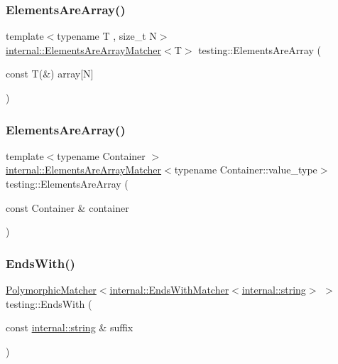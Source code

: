 \subsubsection{\texorpdfstring{Elements\+Are\+Array()}{ElementsAreArray()}\hspace{0.1cm}{\footnotesize\ttfamily [3/4]}}
{\footnotesize\ttfamily template$<$typename T , size\+\_\+t N$>$ \\
\hyperlink{classtesting_1_1internal_1_1_elements_are_array_matcher}{internal\+::\+Elements\+Are\+Array\+Matcher}$<$T$>$ testing\+::\+Elements\+Are\+Array (\begin{DoxyParamCaption}\item[{const T(\&)}]{array\mbox{[}\+N\mbox{]} }\end{DoxyParamCaption})\hspace{0.3cm}{\ttfamily [inline]}}

\mbox{\label{namespacetesting_ad257747adbe056feaa92f449063d681f}} 
\subsubsection{\texorpdfstring{Elements\+Are\+Array()}{ElementsAreArray()}\hspace{0.1cm}{\footnotesize\ttfamily [4/4]}}
{\footnotesize\ttfamily template$<$typename Container $>$ \\
\hyperlink{classtesting_1_1internal_1_1_elements_are_array_matcher}{internal\+::\+Elements\+Are\+Array\+Matcher}$<$typename Container\+::value\+\_\+type$>$ testing\+::\+Elements\+Are\+Array (\begin{DoxyParamCaption}\item[{const Container \&}]{container }\end{DoxyParamCaption})\hspace{0.3cm}{\ttfamily [inline]}}

\mbox{\label{namespacetesting_aec11c4e418a835ca2c0c3cbdb29b28ba}} 
\subsubsection{\texorpdfstring{Ends\+With()}{EndsWith()}}
{\footnotesize\ttfamily \hyperlink{classtesting_1_1_polymorphic_matcher}{Polymorphic\+Matcher}$<$\hyperlink{classtesting_1_1internal_1_1_ends_with_matcher}{internal\+::\+Ends\+With\+Matcher}$<$\hyperlink{namespacetesting_1_1internal_a8e8ff5b11e64078831112677156cb111}{internal\+::string}$>$ $>$ testing\+::\+Ends\+With (\begin{DoxyParamCaption}\item[{const \hyperlink{namespacetesting_1_1internal_a8e8ff5b11e64078831112677156cb111}{internal\+::string} \&}]{suffix }\end{DoxyParamCaption})\hspace{0.3cm}{\ttfamily [inline]}}

